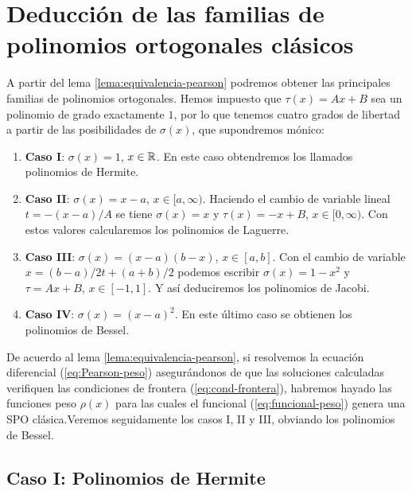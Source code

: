 
\section{Deducción de las familias de polinomios ortogonales clásicos}

A partir del lema \ref{lema:equivalencia-pearson} podremos obtener las principales familias de polinomios ortogonales. Hemos impuesto que $\tau(x)=Ax+B$ sea un polinomio de grado exactamente $1$, por lo que tenemos cuatro grados de libertad a partir de las posibilidades de $\sigma(x)$, que supondremos mónico:

\begin{enumerate}
    \item \textbf{Caso I}: $\sigma(x) = 1$, $x\in\mathbb{R}$. En este caso obtendremos los llamados polinomios de Hermite.
    \item \textbf{Caso II}: $\sigma(x) = x-a$, $x\in[a,\infty)$. Haciendo el cambio de variable lineal $t=-(x-a)/A$ se tiene $\sigma(x) = x$ y $\tau(x)=-x+B$, $x\in[0,\infty)$. Con estos valores calcularemos los polinomios de Laguerre.
    \item \textbf{Caso III}: $\sigma(x) = (x-a)(b-x)$, $x\in[a,b]$. Con el cambio de variable $x = (b-a)/2t + (a+b)/2$ podemos escribir $\sigma(x)=1-x^2$ y $\tau=Ax+B$, $x\in[-1,1]$. Y así deduciremos los polinomios de Jacobi.
    \item \textbf{Caso IV}: $\sigma(x) = (x-a)^2$. En este último caso se obtienen los polinomios de Bessel. 
\end{enumerate}

De acuerdo al lema \ref{lema:equivalencia-pearson}, si resolvemos la ecuación diferencial (\ref{eq:Pearson-peso}) asegurándonos de que las soluciones calculadas verifiquen las condiciones de frontera (\ref{eq:cond-frontera}), habremos hayado las funciones peso $\rho(x)$ para las cuales el funcional (\ref{eq:funcional-peso}) genera una SPO clásica.Veremos seguidamente los casos I, II y III, obviando los polinomios de Bessel.

\subsection{Caso I: Polinomios de Hermite}

